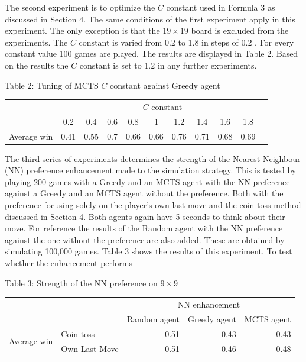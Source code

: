\documentclass[10pt]{article}
\begin{document}
The second experiment is to optimize the $C$ constant used in Formula 3 as discussed in Section 4. The same conditions of the first experiment apply in this experiment. The only exception is that the $19 \times 19$ board is excluded from the experiments. The $C$ constant is varied from 0.2 to 1.8 in steps of 0.2 . For every constant value 100 games are played. The results are displayed in Table 2. Based on the results the $C$ constant is set to 1.2 in any further experiments.

Table 2: Tuning of MCTS $C$ constant against Greedy agent

\begin{center}
\begin{tabular}{cccccccccc}
\hline
 & \multicolumn{10}{c}{$C$ constant} \\
\cline { 2 - 10 }
 & 0.2 & 0.4 & 0.6 & 0.8 & 1 & 1.2 & 1.4 & 1.6 & 1.8 &  \\
\hline
Average win & 0.41 & 0.55 & 0.7 & 0.66 & 0.66 & 0.76 & 0.71 & 0.68 & 0.69 &  \\
\hline
\end{tabular}
\end{center}

The third series of experiments determines the strength of the Nearest Neighbour (NN) preference enhancement made to the simulation strategy. This is tested by playing 200 games with a Greedy and an MCTS agent with the NN preference against a Greedy and an MCTS agent without the preference. Both with the preference focusing solely on the player's own last move and the coin toss method discussed in Section 4. Both agents again have 5 seconds to think about their move. For reference the results of the Random agent with the NN preference against the one without the preference are also added. These are obtained by simulating 100,000 games. Table 3 shows the results of this experiment. To test whether the enhancement performs

Table 3: Strength of the NN preference on $9 \times 9$

\begin{center}
\begin{tabular}{llrrr}
\hline
 &  & \multicolumn{3}{c}{NN enhancement} \\
\cline { 3 - 5 }
 &  & Random agent & Greedy agent & MCTS agent \\
\hline
\multirow{2}{*}{Average win} & Coin toss & 0.51 & 0.43 & 0.43 \\
 & Own Last Move & 0.51 & 0.46 & 0.48 \\
\hline
\end{tabular}
\end{center}
\end{document}
